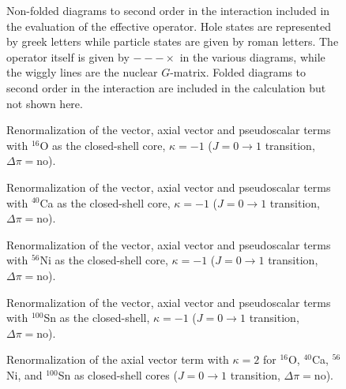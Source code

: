 \begin{figure}[hbtp]
{\centering
\mbox{}
}
       \caption{Non-folded diagrams to second order in the interaction 
                included in the evaluation of the effective 
                operator. Hole states are represented by greek letters while
                particle states are given by roman letters. The operator 
               itself is given by $---\times$ in the various diagrams, 
               while the wiggly lines are the
               nuclear $G$-matrix. Folded diagrams to second order 
               in the interaction are included in the calculation but 
               not shown here.}
       \label{fig:effop2nd}
\end{figure}
\clearpage
\begin{figure}
{\centering
\mbox{}
}
  \caption{Renormalization of the vector, axial vector 
    and pseudoscalar terms with $^{16}$O as the closed-shell
    core, $\kappa=-1$ ($J=0\to 1$ transition, $\Delta\pi=\mathrm{no}$).
    \label{Fig:16}}
\end{figure}
\clearpage
\begin{figure}
{\centering
\mbox{}
}
  \caption{Renormalization of the vector, axial vector 
    and pseudoscalar terms with $^{40}$Ca as the closed-shell
    core, $\kappa=-1$ ($J=0\to 1$ transition, $\Delta\pi=\mathrm{no}$).
    \label{Fig:40}}
\end{figure}
\begin{figure}
{\centering
\mbox{}
}
  \caption{Renormalization of the vector, axial vector 
    and pseudoscalar terms with $^{56}$Ni as the closed-shell
    core, $\kappa=-1$ ($J=0\to 1$ transition, $\Delta\pi=\mathrm{no}$).
    \label{Fig:56}}
\end{figure}
\begin{figure}
{\centering
\mbox{}
}
  \caption{Renormalization of the vector, axial vector 
    and pseudoscalar terms with $^{100}$Sn as the closed-shell,
    $\kappa=-1$ ($J=0\to 1$ transition, $\Delta\pi=\mathrm{no}$).
    \label{Fig:100}}
\end{figure}
\begin{figure}
{\centering
\mbox{}
}
  \caption{Renormalization of the axial vector term with
    $\kappa=2$ for $^{16}$O, $^{40}$Ca, $^{56}$Ni, and $^{100}$Sn 
    as closed-shell cores ($J=0\to 1$ transition, $\Delta\pi=\mathrm{no}$).
    \label{fig:kappa}}
\end{figure}








